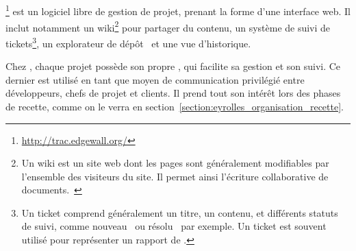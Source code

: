 \subsection{\atrac}
\label{section:outils_trac}

\atrac\footnote{\url{http://trac.edgewall.org/}} est un logiciel libre de gestion de projet, prenant la forme d'une interface web. Il inclut notamment un wiki\footnote{Un wiki est un site web dont les pages sont généralement modifiables par l'ensemble des visiteurs du site. Il permet ainsi l'écriture collaborative de documents.~\cite{wiki}} pour partager du contenu, un système de suivi de tickets\footnote{Un ticket comprend généralement un titre, un contenu, et différents statuts de suivi, comme \og nouveau \fg\ ou \og résolu \fg\ par exemple. Un ticket est souvent utilisé pour représenter un rapport de \abug.}, un explorateur de dépôt \asvn\ et une vue d'historique.

Chez \asl, chaque projet possède son propre \atrac, qui facilite sa gestion et son suivi. Ce dernier est utilisé en tant que moyen de communication privilégié entre développeurs, chefs de projet et clients. Il prend tout son intérêt lors des phases de recette, comme on le verra en section~\ref{section:eyrolles_organisation_recette}.
